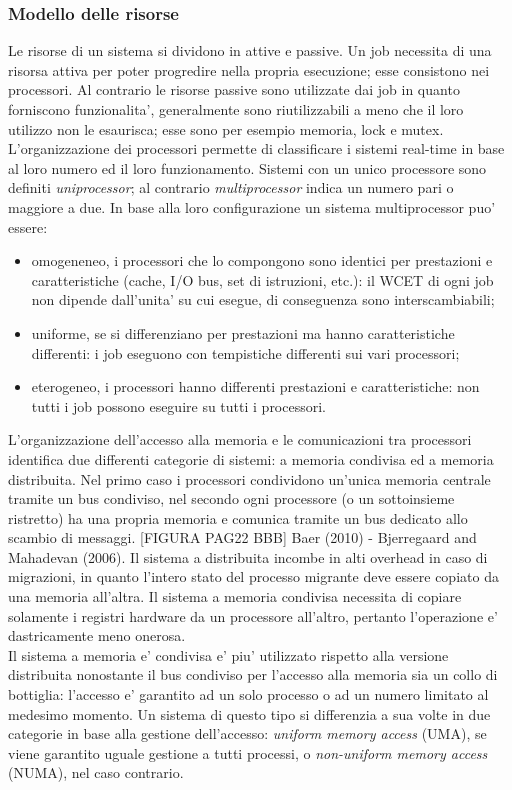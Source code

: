 \subsubsection{Modello delle risorse}
\label{sec:overviewRM}

Le risorse di un sistema si dividono in attive e passive. Un job necessita di una risorsa attiva per poter progredire nella propria esecuzione; esse consistono nei processori. Al contrario le risorse passive sono utilizzate dai job in quanto forniscono funzionalita', generalmente sono riutilizzabili a meno che il loro utilizzo non le esaurisca; esse sono per esempio memoria, lock e mutex.\\

L'organizzazione dei processori permette di classificare i sistemi real-time in base al loro numero ed il loro funzionamento. Sistemi con un unico processore sono definiti \textit{uniprocessor}; al contrario \textit{multiprocessor} indica un numero pari o maggiore a due. In base alla loro configurazione un sistema multiprocessor puo' essere:

\begin{itemize}
	\item omogeneneo, i processori che lo compongono sono identici per prestazioni e caratteristiche (cache, I/O bus, set di istruzioni, etc.): il WCET di ogni job non dipende dall'unita' su cui esegue, di conseguenza sono interscambiabili;
	\item uniforme, se si differenziano per prestazioni ma hanno caratteristiche differenti: i job eseguono con tempistiche differenti sui vari processori;
	\item eterogeneo, i processori hanno differenti prestazioni e caratteristiche: non tutti i job possono eseguire su tutti i processori.
\end{itemize}

L'organizzazione dell'accesso alla memoria e le comunicazioni tra processori identifica due differenti categorie di sistemi: a memoria condivisa ed a memoria distribuita. Nel primo caso i processori condividono un'unica memoria centrale tramite un bus condiviso, nel secondo ogni processore (o un sottoinsieme ristretto) ha una propria memoria e comunica tramite un bus dedicato allo scambio di messaggi. [FIGURA PAG22 BBB] Baer (2010) - Bjerregaard and Mahadevan (2006). Il sistema a distribuita incombe in alti overhead in caso di migrazioni, in quanto l'intero stato del processo migrante deve essere copiato da una memoria all'altra. Il sistema a memoria condivisa necessita di copiare solamente i registri hardware da un processore all'altro, pertanto l'operazione e' dastricamente meno onerosa.\\
Il sistema a memoria e' condivisa e' piu' utilizzato rispetto alla versione distribuita nonostante il bus condiviso per l'accesso alla memoria sia un collo di bottiglia: l'accesso e' garantito ad un solo processo o ad un numero limitato al medesimo momento. Un sistema di questo tipo si differenzia a sua volte in due categorie in base alla gestione dell'accesso: \textit{uniform memory access} (UMA), se viene garantito uguale gestione a tutti processi, o \textit{non-uniform memory access} (NUMA), nel caso contrario.\\


